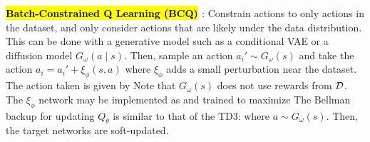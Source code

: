 \documentclass{article}
\begin{document}
  \textbf{\hl{Batch-Constrained Q Learning (BCQ)} \cite{fujimoto2019off}}: Constrain actions to only actions in the dataset, and only consider actions that are likely under the data distribution. This can be done with a generative model such as a conditional VAE or a diffusion model $G_\omega(a\mid s)$. Then, sample an action $a_i'\sim G_\omega(s)$ and take the action $a_i=a_i'+\xi_\phi(s,a)$ where $\xi_\phi$ adds a small perturbation near the dataset. The action taken is given by
  Note that $G_\omega(s)$ does not use rewards from $\mathcal{D}$. The $\xi_\phi$ network may be implemented as
  and trained to maximize
  The Bellman backup for updating $Q_\theta$ is similar to that of the TD3:
  where $a\sim G_\omega(s)$. Then, the target networks are soft-updated.
\end{document}
